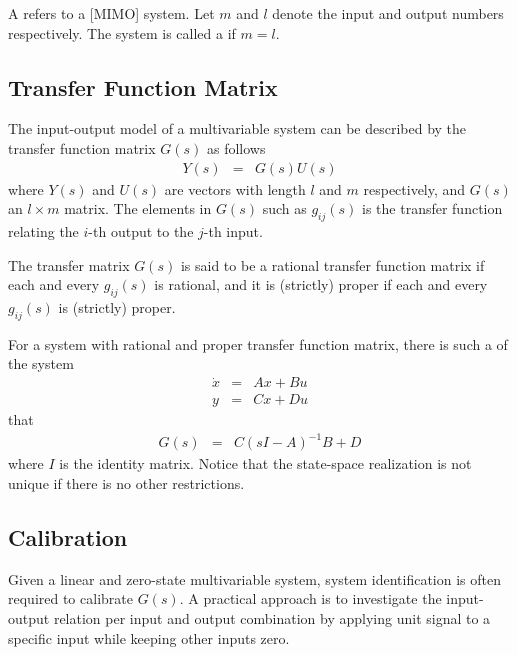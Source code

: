 A  refers to a [MIMO] system. Let $m$ and $l$ denote the input and output numbers respectively. The system is called a  if $m=l$.

\subsection{Transfer Function Matrix}

The input-output model of a multivariable system can be described by the transfer function matrix $G(s)$ as follows
\begin{eqnarray}
	Y(s) &=& G(s)U(s) \nonumber
\end{eqnarray}
where $Y(s)$ and $U(s)$ are vectors with length $l$ and $m$ respectively, and $G(s)$ an $l\times m$ matrix. The elements in $G(s)$ such as $g_{ij}(s)$ is the transfer function relating the $i$-th output to the $j$-th input.

The transfer matrix $G(s)$ is said to be a rational transfer function matrix if each and every $g_{ij}(s)$ is rational, and it is (strictly) proper if each and every $g_{ij}(s)$ is (strictly) proper.

For a system with rational and proper transfer function matrix, there is such a  of the system
\begin{eqnarray}
	\dot{x} &=& Ax + Bu \nonumber \\
	y &=& Cx + Du \nonumber
\end{eqnarray}
that
\begin{eqnarray}
	G(s) &=& C(sI-A)^{-1}B + D \nonumber
\end{eqnarray}
where $I$ is the identity matrix. Notice that the state-space realization is not unique if there is no other restrictions.

\subsection{Calibration}

Given a linear and zero-state multivariable system, system identification is often required to calibrate $G(s)$. A practical approach is to investigate the input-output relation per input and output combination by applying unit signal to a specific input while keeping other inputs zero.








